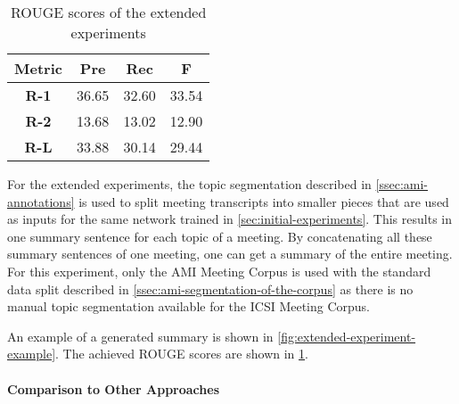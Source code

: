 \begin{table}[h]
\centering
\begin{tabular}{@{}clll@{}}
\toprule
\textbf{Metric} & \multicolumn{1}{c}{\textbf{Pre}} & \multicolumn{1}{c}{\textbf{Rec}} & \multicolumn{1}{c}{\textbf{F}} \\ \midrule
\textbf{R-1}    & 36.65                           & 32.60                           & 33.54                         \\
\textbf{R-2}    & 13.68                           & 13.02                           & 12.90                         \\
\textbf{R-L}    & 33.88                           & 30.14                           & 29.44                         \\ \bottomrule
\end{tabular}
\caption{ROUGE scores of the extended experiments}
\label{tab:extended-experiment-rouge}
\end{table}

For the extended experiments, the topic segmentation described in \cref{ssec:ami-annotations} is used to split meeting transcripts into smaller pieces that are used as inputs for the same network trained in \cref{sec:initial-experiments}.
This results in one summary sentence for each topic of a meeting.
By concatenating all these summary sentences of one meeting, one can get a summary of the entire meeting.
For this experiment, only the AMI Meeting Corpus is used with the standard data split described in \cref{ssec:ami-segmentation-of-the-corpus} as there is no manual topic segmentation available for the ICSI Meeting Corpus. %

An example of a generated summary is shown in \cref{fig:extended-experiment-example}.
The achieved ROUGE scores are shown in \cref{tab:extended-experiment-rouge}.

\paragraph{Comparison to Other Approaches}

